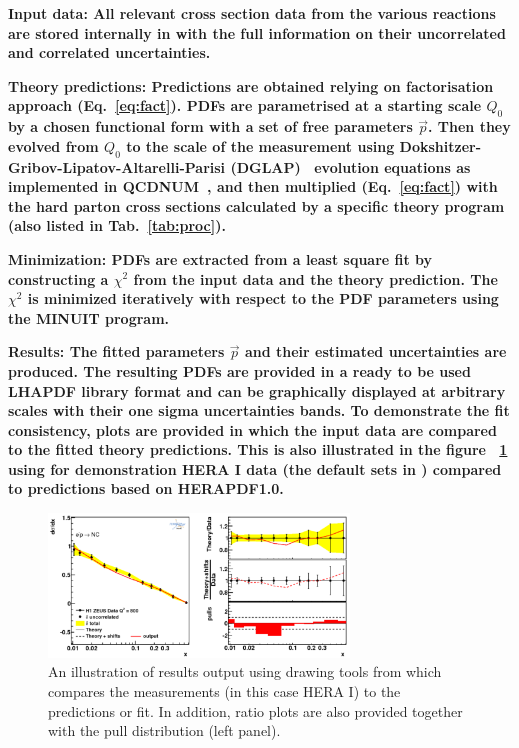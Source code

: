 \begin{description}
\item 
\bf {Input data:} \rm  All relevant cross section data from the various reactions
are stored internally in \fitter with the full information on their uncorrelated and correlated
uncertainties.
\item
\bf{Theory predictions:} \rm Predictions are obtained relying on factorisation approach (Eq.~\ref{eq:fact}). PDFs are parametrised at a starting scale $Q_0$  by a chosen functional form with a set of free parameters $\vec{p}$. Then they evolved from $Q_0$ to the scale of the measurement using 
Dokshitzer-Gribov-Lipatov-Altarelli-Parisi 
(DGLAP)~\cite{Gribov:1972ri, Gribov:1972rt, Lipatov:1974qm,
Dokshitzer:1977sg, Altarelli:1977zs} evolution equations 
as implemented in QCDNUM~\cite{qcdnum}, 
and then multiplied (Eq.~\ref{eq:fact}) with the hard parton cross sections calculated by
a specific theory program (also listed in Tab.~\ref{tab:proc}).
\item
\bf{Minimization:} \rm  PDFs are extracted from a least square fit by constructing a 
$\chi^2$ from the input data and the theory prediction.
The $\chi^2$ is  minimized iteratively 
with respect to the PDF parameters using the MINUIT\cite{minuit} program.
%
%
\item
\bf{Results:} \rm  The fitted parameters $\vec{p}$ and their estimated uncertainties are produced.
The resulting PDFs are provided in a ready to be used LHAPDF library format
and can be graphically 
displayed at arbitrary scales with their one sigma uncertainties bands.
To demonstrate the fit consistency, plots are provided 
in which the input data are compared to the fitted theory predictions. This is also illustrated in the figure ~\ref{fig:data} using for demonstration HERA I data (the default sets in \fitter) compared to predictions based on HERAPDF1.0\cite{h1zeus:2009wt}.  
\begin{figure}[!ht]
   \centering
   \includegraphics[width=8cm]{datatheory.pdf}
   \caption{An illustration of results output using drawing tools from \fitter which compares the measurements (in this case HERA I) to the predictions or fit. In addition, ratio plots are also provided together with the pull distribution (left panel).} 
 \label{fig:data}
\end{figure}

\end{description}
